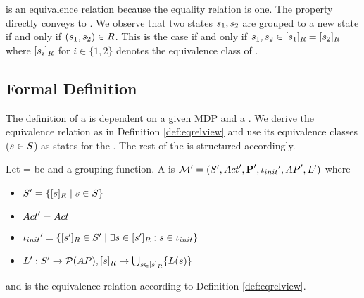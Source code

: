 \documentclass[preview]{standalone}
\begin{document}
\eqrelview is an equivalence relation because the equality relation is one. The property directly conveys to \eqrelview. We observe that two states ${s}_1, {s}_2$ are grouped to a new state if and only if $({s}_1, {s}_2) \in {R}$. This is the case if and only if ${s}_1, {s}_2 \in {\ensuremath{{[{s}_1]_{{R}}}}} = {{[{s}_2]_{{R}}}}$ where ${{[{s}_i]_{{R}}}}$ for $i \in \{1,2\}$ denotes the equivalence class of \eqrelview.

\subsection{Formal Definition}

The definition of a \viewN is dependent on a given MDP and a \grpfctN \grpfct. We derive the equivalence relation \eqrelview as in Definition \ref{def:eqrelview} and use its equivalence classes  (${s} \in {S}$) as states for the \viewN. The rest of the \chosengraphtypeN is structured accordingly.


\begin{definition}
	
	Let \chgph = \chgphtuple be \chosengraphtypeN and \grpfct a grouping function. A \emph{\viewN} \view{\viewppty} is \chosengraphtypeN ${{\mathcal{M}}}' = {{({S}', {Act}', {\textbf{P}}', {\iota_{init}}', {AP}', {L}')}}$  where
	
	\begin{itemize}
		\item ${S}' = \{ {[{s}]_{{R}}} \mid {s} \in {S} \}$
		
		\item ${Act}' = {Act}$
		
		
		\item ${{\iota_{init}}}' = \{{{[{s}']_{{R}}}} \in {S}' \mid \exists {s} \in {\ensuremath{{[{s}']_{{R}}}}} : {s} \in {\ensuremath{{\iota_{init}}}} \}$
		
		\item ${L}': {S}' \to {\mathcal{P}(\ensuremath{{AP}})}, {{[{s}]_{{R}}}}\mapsto \bigcup_{{s} \in {\ensuremath{{[{s}]_{{R}}}}}} \{{L}({s})\}$
		
	\end{itemize}
	
	and \eqrelview is the equivalence relation according to Definition \ref{def:eqrelview}.
	

	\label{def:view}	
\end{definition}
\end{document}
